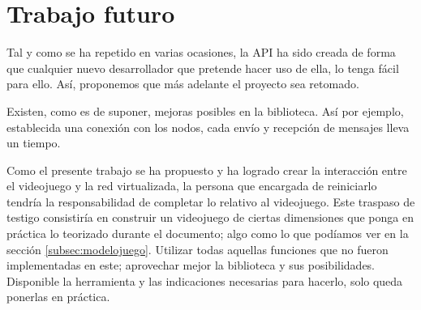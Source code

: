 \section{Trabajo futuro}
Tal y como se ha repetido en varias ocasiones, la API ha sido creada de forma que cualquier nuevo desarrollador que pretende hacer uso de ella, lo tenga fácil para ello. Así, proponemos que más adelante el proyecto sea retomado. 

Existen, como es de suponer, mejoras posibles en la biblioteca. Así por ejemplo, establecida una conexión con los nodos, cada envío y recepción de mensajes lleva un tiempo. 

Como el presente trabajo se ha propuesto y ha logrado crear la interacción entre el videojuego y la red virtualizada, la persona que encargada de reiniciarlo tendría la responsabilidad de completar lo relativo al videojuego. Este traspaso de testigo consistiría en construir un videojuego de ciertas dimensiones que ponga en práctica lo teorizado durante el documento; algo como lo que podíamos ver en la sección \ref{subsec:modelojuego}. Utilizar todas aquellas funciones que no fueron implementadas en este; aprovechar mejor la biblioteca y sus posibilidades. Disponible la herramienta y las indicaciones necesarias para hacerlo, solo queda ponerlas en práctica.